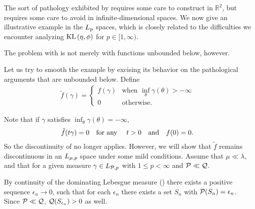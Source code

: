 The sort of pathology exhibited by 
requires some care to construct in $\mathbb{R}^2$, but requires some care to
avoid in infinite-dimensional spaces.  We now give an illustrative example in
the ${L_{p}}$ spaces, which is closely related to the difficulties we encounter
analyzing $\mathrm{KL}\left(\eta, \phi\right)$ for $p \in [1, \infty)$.

The problem with  is not merely with
functions unbounded below, however.

\begin{ex}
%
Let us try to smooth the example  by excising its
behavior on the pathological arguments that are unbounded below. Define
%
\begin{align*}
%
\tilde{f}(\gamma) = \begin{cases}
    f(\gamma) & \textrm{when }\inf_\theta \gamma(\theta) > -\infty \\
    0 & \textrm{otherwise}.
\end{cases}
%
\end{align*}

Note that if $\gamma$ satisfies $\inf_\theta \gamma(\theta) = -\infty$,
%
\begin{align*}
%
\tilde{f}(\t \gamma) = 0 \mathtxt{for any }\t > 0 \mathtxt{and} f(\phiz) = 0.
%
\end{align*}
%
So the discontinuity of  no longer applies.
However, we will show that $\tilde{f}$ remains discontinuous in an ${L_{\mu,p}}$
space under some mild conditions. Assume that $\mu \ll \lambda$, and that for a
given measure $\gamma \in {L_{\mathcal{P},p}}$ with $1 \le p < \infty$ and  $\mathcal{P} \ll \mathcal{Q}$.

By continuity of the dominating Lebesgue measure ()
there exists a positive sequence $\epsilon_n \rightarrow 0$, such that for each
$\epsilon_n$ there exists a set $S_n$ with $\mathcal{P}(S_n) = \epsilon_n$.
Since $\mathcal{P} \ll \mathcal{Q}$, $\mathcal{Q}(S_{\epsilon_n}) > 0$ as well.


\end{ex}
